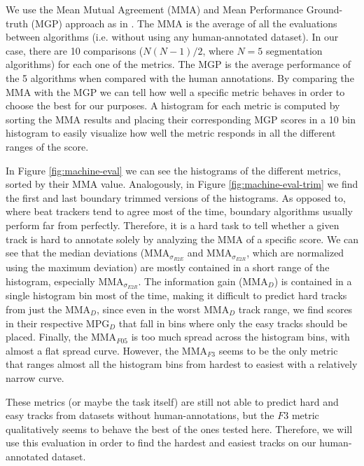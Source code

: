 \documentclass{article}
\begin{document}
We use the Mean Mutual Agreement (MMA) and Mean Performance Ground-truth (MGP) approach as in \cite{Holzapfel2012}.
The MMA is the average of all the evaluations between algorithms (i.e. without using any human-annotated dataset).
In our case, there are 10 comparisons ($N(N-1)/2$, where $N=5$ segmentation algorithms) for each one of the metrics.
The MGP is the average performance of the 5 algorithms when compared with the human annotations.
By comparing the MMA with the MGP we can tell how well a specific metric behaves in order to choose the best for our purposes.
A histogram for each metric is computed by sorting the MMA results and placing their corresponding MGP scores in a 10 bin histogram to easily visualize how well the metric responds in all the different ranges of the score.

In Figure \ref{fig:machine-eval} we can see the histograms of the different metrics, sorted by their MMA value.
Analogously, in Figure \ref{fig:machine-eval-trim} we find the first and last boundary trimmed versions of the histograms.
As opposed to\cite{Holzapfel2012}, where beat trackers tend to agree most of the time, boundary algorithms usually perform far from perfectly.
Therefore, it is a hard task to tell whether a given track is hard to annotate solely by analyzing the MMA of a specific score.
We can see that the median deviations (MMA$_{\sigma_{R2E}}$ and MMA$_{\sigma_{E2R}}$, which are normalized using the maximum deviation) are mostly contained in a short range of the histogram, especially MMA$_{\sigma_{E2R}}$.
The information gain (MMA$_D$) is contained in a single histogram bin most of the time, making it difficult to predict hard tracks from just the MMA$_D$, since even in the worst MMA$_D$ track range, we find scores in their respective MPG$_D$ that fall in bins where only the easy tracks should be placed.
Finally, the MMA$_{F05}$ is too much spread across the histogram bins, with almost a flat spread curve.
However, the MMA$_{F3}$ seems to be the only metric that ranges almost all the histogram bins from hardest to easiest with a relatively narrow curve.

These metrics (or maybe the task itself) are still not able to predict hard and easy tracks from datasets without human-annotations, but the $F3$ metric qualitatively seems to behave the best of the ones tested here.
Therefore, we will use this evaluation in order to find the hardest and easiest tracks on our human-annotated dataset.
\end{document}
